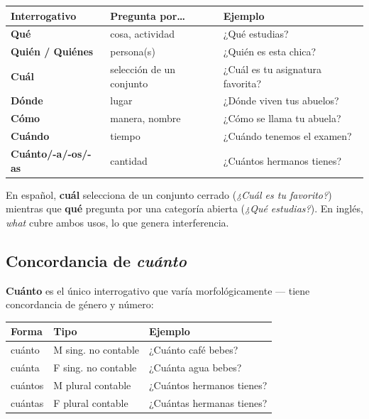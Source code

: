 \documentclass[a4paper,10pt]{article}
\renewcommand{\arraystretch}{1.3}
\begin{document}
\begin{center}
\renewcommand{\arraystretch}{1.4}
\begin{tabular}{|>{\bfseries}l|l|l|}
\hline
\rowcolor{naranja!15}
\textbf{Interrogativo} & \textbf{Pregunta por\ldots} & \textbf{Ejemplo} \\
\hline
Qué & cosa, actividad & ¿Qué estudias? \\
\hline
Quién / Quiénes & persona(s) & ¿Quién es esta chica? \\
\hline
Cuál & selección de un conjunto & ¿Cuál es tu asignatura favorita? \\
\hline
Dónde & lugar & ¿Dónde viven tus abuelos? \\
\hline
Cómo & manera, nombre & ¿Cómo se llama tu abuela? \\
\hline
Cuándo & tiempo & ¿Cuándo tenemos el examen? \\
\hline
Cuánto/-a/-os/-as & cantidad & ¿Cuántos hermanos tienes? \\
\hline
\end{tabular}
\end{center}

\vspace{0.3cm}

\begin{notabox}
En español, \textbf{cuál} selecciona de un conjunto cerrado (\textit{¿Cuál es tu favorito?}) mientras que \textbf{qué} pregunta por una categoría abierta (\textit{¿Qué estudias?}). En inglés, \textit{what} cubre ambos usos, lo que genera interferencia.
\end{notabox}

\vspace{0.3cm}

\subsection*{\textcolor{naranja}{Concordancia de \textit{cuánto}}}

\textbf{Cuánto} es el único interrogativo que varía morfológicamente --- tiene concordancia de género y número:

\vspace{0.2cm}

\begin{center}
\renewcommand{\arraystretch}{1.3}
\begin{tabular}{|l|l|l|}
\hline
\rowcolor{naranja!15}
\textbf{Forma} & \textbf{Tipo} & \textbf{Ejemplo} \\
\hline
cuánto & M sing. no contable & ¿Cuánto café bebes? \\
\hline
cuánta & F sing. no contable & ¿Cuánta agua bebes? \\
\hline
cuántos & M plural contable & ¿Cuántos hermanos tienes? \\
\hline
cuántas & F plural contable & ¿Cuántas hermanas tienes? \\
\hline
\end{tabular}
\end{center}
\end{document}
